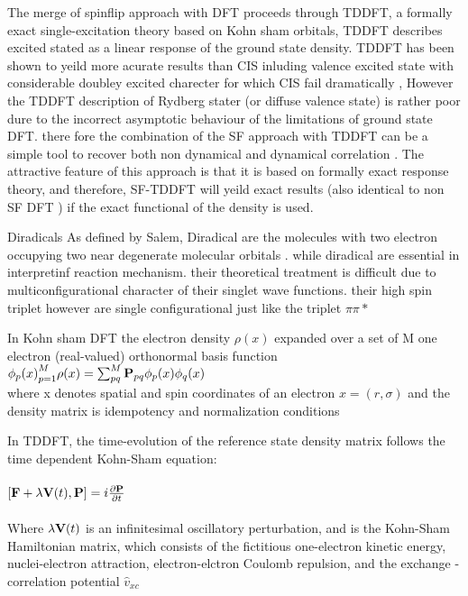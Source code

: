 The merge of spinflip approach with DFT proceeds through TDDFT, a formally exact single-excitation theory based on Kohn sham orbitals, TDDFT  describes excited stated as a linear response of the ground state density. TDDFT has been shown to yeild more acurate results than CIS inluding valence excited state with considerable doubley excited charecter for which CIS fail dramatically , However the TDDFT description of Rydberg stater (or diffuse valence state) is rather poor dure to the incorrect asymptotic behaviour of the limitations of ground state DFT. there fore the combination of the SF approach with TDDFT can be a simple tool to recover both non dynamical and dynamical correlation .  The attractive feature of this approach is that it is based on formally exact response theory, and therefore, SF-TDDFT will yeild exact results (also identical to non SF DFT ) if the exact functional of the density is used.

Diradicals As defined by Salem, Diradical are the molecules with two electron occupying two near degenerate molecular orbitals . while diradical are essential in interpretinf reaction mechanism. their theoretical treatment is difficult due to multiconfigurational  character of their singlet wave functions.  their high spin triplet however are single configurational  just like the triplet \(\pi\pi\ast\)

In Kohn sham DFT the electron density \(\rho(x)\) expanded over a set of M one electron (real-valued) orthonormal basis function\\ \({\phi _{p}(x)}_{p=1}^M \\
\rho(x) = \sum_{pq}^{M}\bold{P}_{pq}\phi_{p}(x)\phi_{q}(x)
\)\\
where x denotes spatial and spin coordinates of an electron \( x = (r, \sigma) \) and the density matrix  is idempotency and normalization conditions

In TDDFT, the time-evolution of the reference state density matrix follows the time dependent Kohn-Sham equation:\\ \\
\(
[\bold{F} + \lambda \bold{V}(t), \bold{P}] = i\frac{\partial \bold{P}}{\partial t}
\)\\ \\
Where \(\lambda\bold{V}(t)\) is an infinitesimal oscillatory perturbation, and  is the Kohn-Sham Hamiltonian matrix, which consists of the fictitious one-electron kinetic energy, nuclei-electron attraction,  electron-elctron Coulomb repulsion, and the exchange -correlation potential \(\hat{v}_{xc}\)
\\



